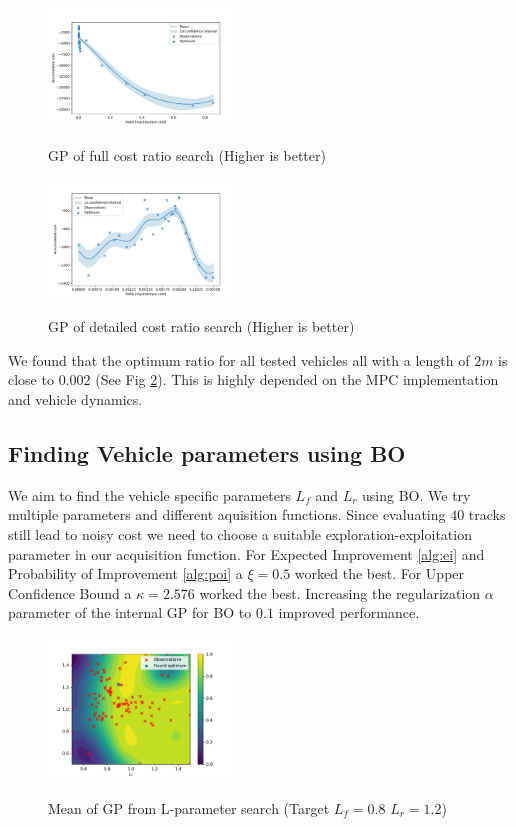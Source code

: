 \documentclass[twoside,twocolumn]{article}
\begin{document}
\begin{figure}[h]
    \caption{GP of full cost ratio search (Higher is better)}
    \centering
    \includegraphics[width=0.45\textwidth]{fig_cost_ratio_full.pdf}
    \label{fig:cost_ratio_full}
\end{figure}

\begin{figure}[h]
    \caption{GP of detailed cost ratio search (Higher is better)}
    \centering
    \includegraphics[width=0.45\textwidth]{fig_cost_ratio_detail.pdf}
    \label{fig:cost_ratio_detail}
\end{figure}

We found that the optimum ratio for all tested vehicles all with a length of $2m$ is close to $0.002$ (See Fig \ref{fig:cost_ratio_detail}). This is highly depended on the MPC implementation and vehicle dynamics.

\subsection{Finding Vehicle parameters using BO}

We aim to find the vehicle specific parameters $L_f$ and $L_r$ using BO. We try multiple parameters and different aquisition functions. Since evaluating $40$ tracks still lead to noisy cost we need to choose a suitable exploration-exploitation parameter in our acquisition function. For Expected Improvement \ref{alg:ei} and Probability of Improvement \ref{alg:poi} a $\xi = 0.5$ worked the best. For Upper Confidence Bound a $\kappa=2.576$ worked the best. Increasing the regularization $\alpha$ parameter of the internal GP for BO to $0.1$ improved performance.

\begin{figure}[h]
    \caption{Mean of GP from L-parameter search (Target $L_f = 0.8$ $L_r = 1.2$)}
    \centering
    \includegraphics[width=0.45\textwidth]{fig_l_estimation_full.pdf}
    \label{fig:l_param_full}
\end{figure}
\end{document}
